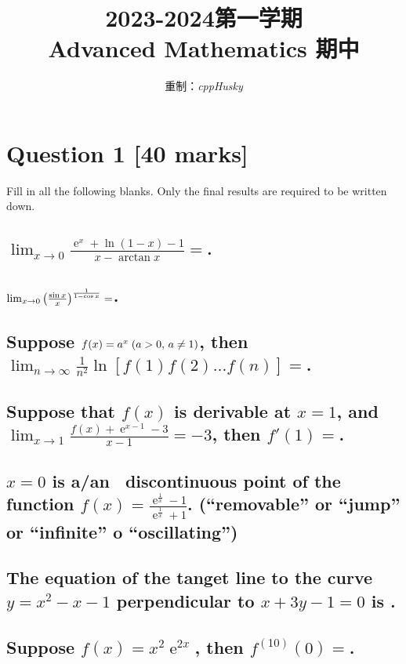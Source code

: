 \documentclass[12pt]{ctexart}
\title{2023-2024第一学期\\Advanced Mathematics 期中}
\author{重制：\textit{cppHusky}}
\date{}
\DeclareMathOperator{\ee}{\mathrm{e}}
\begin{document}
\pagestyle{fancy}
\fancyhf{}
\maketitle
\thispagestyle{fancy}

\section{\bf Question 1 [40 marks]}
Fill in all the following blanks. Only the final results are required to be written down.
\subsection{\(\lim_{x\rightarrow0}\frac{\ee^{x}+\ln(1-x)-1}{x-\arctan{x}}=\)\blank.}
\subsection{\(\lim_{x\rightarrow0}\qty(\frac{\sin{x}}{x})^{\frac{1}{1-\cos{x}}}=\)\blank.}
\subsection{Suppose \(f(x)=a^{x}\;\qty(a>0,\,a\ne1)\), then \(\lim_{n\rightarrow\infty}\frac{1}{n^{2}}\ln[f(1)f(2)\dots f(n)]=\)\blank.}
\subsection{Suppose that \(f(x)\) is derivable at \(x=1\), and \(\lim_{x\rightarrow1}\frac{f(x)+\ee^{x-1}-3}{x-1}=-3\), then \(f'(1)=\)\blank.}
\subsection{\(x=0\) is a/an \blank\ discontinuous point of the function \(f(x)=\frac{\ee^{\frac{1}{x}}-1}{\ee^{\frac{1}{x}}+1}\). (``removable'' or ``jump'' or ``infinite'' o ``oscillating'')}
\subsection{The equation of the tanget line to the curve \(y=x^{2}-x-1\) perpendicular to \(x+3y-1=0\) is \blank.}
\subsection{Suppose \(f(x)=x^{2}\ee^{2x}\), then \(f^{(10)}(0)=\)\blank.}
\end{document}
